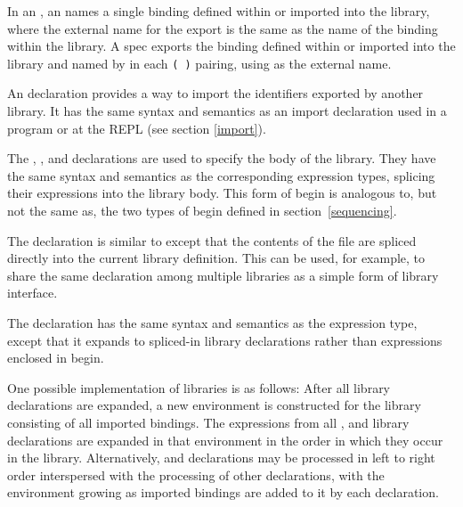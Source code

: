 In an , an  names a single
binding defined within or imported into the library, where the
external name for the export is the same as the name of the binding
within the library. A  spec exports the binding 
defined within or imported into the library and named by
 in each
{\tt( )} pairing,
using  as the external name.

An  declaration provides a way to import the identifiers
exported by another library.  It has the same syntax and semantics as
an import declaration used in a program or at the REPL (see section
\ref{import}).

The , , and  declarations are
used to specify the body of
the library.  They have the same syntax and semantics as the corresponding
expression types, splicing their expressions into the library body.
This form of {\cf begin} is analogous to, but not the same as, the
two types of {\cf begin} defined in section~\ref{sequencing}.

The  declaration is similar to
 except that the contents of the file are spliced directly into the
current library definition.  This can be used, for example, to share the
same  declaration among multiple libraries as a simple
form of library interface.

The  declaration has the same syntax and semantics as
the  expression type, except that it expands to
spliced-in library declarations rather than expressions enclosed in {\cf begin}.


One possible implementation of libraries is as follows:
After all  library declarations are expanded, a new
environment is constructed for the library consisting of all
imported bindings.  The expressions
from all ,  and 
library declarations are expanded in that environment in the order in which
they occur in the library.
Alternatively,  and  declarations may be processed
in left to right order interspersed with the processing of other
declarations, with the environment growing as imported bindings are
added to it by each  declaration.

